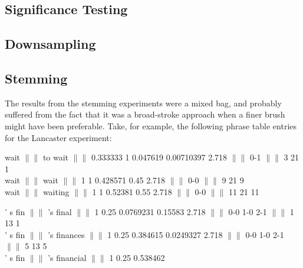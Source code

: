 \documentclass[11pt,letterpaper]{article}
\begin{document}
\subsection{Significance Testing}
\subsection{Downsampling}
\subsection{Stemming}

The results from the stemming experiments were a mixed bag, and probably suffered from the fact that it was a broad-stroke approach when a finer brush might have been preferable. Take, for example, the following phrase table entries for the Lancaster experiment:

\begin{framed}
wait $\|\|$ to wait $\|\|$ 0.333333 1 0.047619 0.00710397 2.718 $\|\|$ 0-1 $\|\|$ 3 21 1 \\
wait $\|\|$ wait $\|\|$ 1 1 0.428571 0.45 2.718 $\|\|$ 0-0 $\|\|$ 9 21 9 \\
wait $\|\|$ waiting $\|\|$ 1 1 0.52381 0.55 2.718 $\|\|$ 0-0 $\|\|$ 11 21 11
\end{framed}

\begin{framed}
' s fin $\|\|$ 's final $\|\|$ 1 0.25 0.0769231 0.15583 2.718 $\|\|$ 0-0 1-0 2-1 $\|\|$ 1 13 1 \\
' s fin $\|\|$ 's finances $\|\|$ 1 0.25 0.384615 0.0249327 2.718 $\|\|$ 0-0 1-0 2-1 $\|\|$ 5 13 5 \\
' s fin $\|\|$ 's financial $\|\|$ 1 0.25 0.538462
\end{framed}
\end{document}
